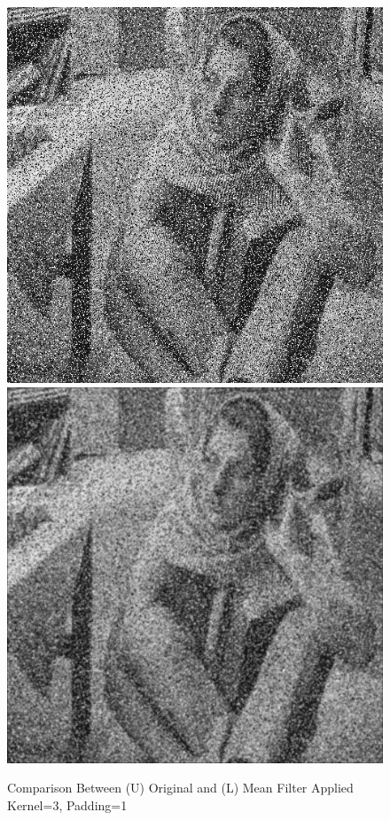 \documentclass[12pt,a4paper]{report}
\begin{document}
\begin{figure}[!htb]
  \centering
  \includegraphics[height=0.4\paperheight]{test_img/noise1.png}
  \includegraphics[height=0.4\paperheight]{result_img/noise1_q1.png}
  \caption{Comparison Between (U) Original and (L) Mean Filter Applied Kernel=3, Padding=1}
\end{figure}
\clearpage
\end{document}
